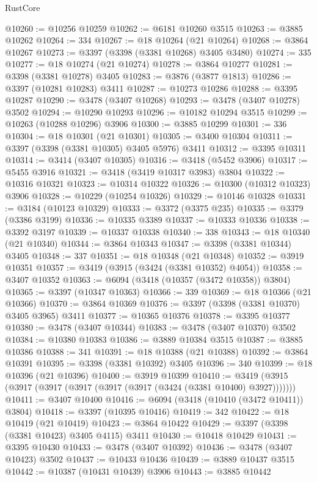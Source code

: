 \begin{lexlean}{RustCore}
\begin{coremodule}
@10260 := @10256 @10259
@10262 := @6181 @10260 @3515
@10263 := @3885 @10262
@10264 := 334
@10267 := @18 @10264 (@21 @10264)
@10268 := @3864 @10267
@10273 := @3397 (@3398 (@3381 @10268) @3405 @3480)
@10274 := 335
@10277 := @18 @10274 (@21 @10274)
@10278 := @3864 @10277
@10281 := @3398 (@3381 @10278) @3405
@10283 := @3876 (@3877 @1813)
@10286 := @3397 (@10281 @10283) @3411
@10287 := @10273 @10286
@10288 := @3395 @10287
@10290 := @3478 (@3407 @10268)
@10293 := @3478 (@3407 @10278) @3502
@10294 := @10290 @10293
@10296 := @10182 @10294 @3515
@10299 := @10263 (@10288 @10296) @3906
@10300 := @3885 @10299
@10301 := 336
@10304 := @18 @10301 (@21 @10301)
@10305 := @3400 @10304
@10311 := @3397 (@3398 (@3381 @10305) @3405 @5976) @3411
@10312 := @3395 @10311
@10314 := @3414 (@3407 @10305)
@10316 := @3418 (@5452 @3906)
@10317 := @5455 @3916
@10321 := @3418 (@3419 @10317 @3983) @3804
@10322 := @10316 @10321
@10323 := @10314 @10322
@10326 := @10300 (@10312 @10323) @3906
@10328 := @10229 (@10254 @10326)
@10329 := @10146 @10328
@10331 := @3184 (@10123 @10329)
@10333 := @3372 (@3375 @235)
@10335 := @3379 (@3386 @3199)
@10336 := @10335 @3389
@10337 := @10333 @10336
@10338 := @3392 @3197
@10339 := @10337 @10338
@10340 := 338
@10343 := @18 @10340 (@21 @10340)
@10344 := @3864 @10343
@10347 := @3398 (@3381 @10344) @3405
@10348 := 337
@10351 := @18 @10348 (@21 @10348)
@10352 := @3919 @10351
@10357 := @3419 (@3915 (@3424 (@3381 @10352) @4054))
@10358 := @3407 @10352
@10363 := @6094 (@3418 (@10357 (@3472 @10358)) @3804)
@10365 := @3397 (@10347 @10363)
@10366 := 339
@10369 := @18 @10366 (@21 @10366)
@10370 := @3864 @10369
@10376 := @3397 (@3398 (@3381 @10370) @3405 @3965) @3411
@10377 := @10365 @10376
@10378 := @3395 @10377
@10380 := @3478 (@3407 @10344)
@10383 := @3478 (@3407 @10370) @3502
@10384 := @10380 @10383
@10386 := @3889 @10384 @3515
@10387 := @3885 @10386
@10388 := 341
@10391 := @18 @10388 (@21 @10388)
@10392 := @3864 @10391
@10395 := @3398 (@3381 @10392) @3405
@10396 := 340
@10399 := @18 @10396 (@21 @10396)
@10400 := @3919 @10399
@10410 := @3419 (@3915 (@3917 (@3917 (@3917 (@3917 (@3917 (@3424 (@3381 @10400) @3927)))))))
@10411 := @3407 @10400
@10416 := @6094 (@3418 (@10410 (@3472 @10411)) @3804)
@10418 := @3397 (@10395 @10416)
@10419 := 342
@10422 := @18 @10419 (@21 @10419)
@10423 := @3864 @10422
@10429 := @3397 (@3398 (@3381 @10423) @3405 @4115) @3411
@10430 := @10418 @10429
@10431 := @3395 @10430
@10433 := @3478 (@3407 @10392)
@10436 := @3478 (@3407 @10423) @3502
@10437 := @10433 @10436
@10439 := @3889 @10437 @3515
@10442 := @10387 (@10431 @10439) @3906
@10443 := @3885 @10442

\end{coremodule}
\end{lexlean}
